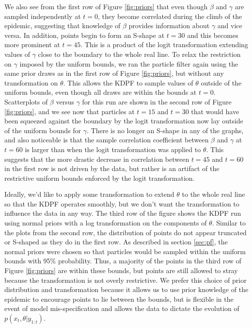 \documentclass{elsarticle}
\begin{document}
We also see from the first row of Figure \ref{fig:priors} that even though $\beta$ and $\gamma$ are sampled independently at $t = 0$, they become correlated during the climb of the epidemic, suggesting that knowledge of $\beta$ provides information about $\gamma$ and vice versa. In addition, points begin to form an S-shape at $t = 30$ and this becomes more prominent at $t = 45$.  This is a product of the logit transformation extending values of $\gamma$ close to the boundary to the whole real line.  To relax the restriction on $\gamma$ imposed by the uniform bounds, we ran the particle filter again using the same prior draws as in the first row of Figure \ref{fig:priors}, but without any transformation on $\theta$.  This allows the KDPF to sample values of $\theta$ outside of the uniform bounds, even though all draws are within the bounds at $t = 0$.  Scatterplots of $\beta$ versus $\gamma$ for this run are shown in the second row of Figure \ref{fig:priors}, and we see now that particles at $t = 15$ and $t = 30$ that would have been squeezed against the boundary by the logit transformation now lay outside of the uniform bounds for $\gamma$.  There is no longer an S-shape in any of the graphs, and also noticeable is that the sample correlation coefficient between $\beta$ and $\gamma$ at $t = 60$ is larger than when the logit transformation was applied to $\theta$.  This suggests that the more drastic decrease in correlation between $t = 45$ and $t = 60$ in the first row is not driven by the data, but rather is an artifact of the restrictive uniform bounds enforced by the logit transformation.

Ideally, we'd like to apply some transformation to extend $\theta$ to the whole real line so that the KDPF operates smoothly, but we don't want the transformation to influence the data in any way.  The third row of the figure shows the KDPF run using normal priors with a log transformation on the components of $\theta$.  Similar to the plots from the second row, the distribution of points do not appear truncated or S-shaped as they do in the first row.  As described in section \ref{sec:pf}, the normal priors were chosen so that particles would be sampled within the uniform bounds with 95\% probability.  Thus, a majority of the points in the third row of Figure \ref{fig:priors} are within these bounds, but points are still allowed to stray because the transformation is not overly restrictive.  We prefer this choice of prior distribution and transformation because it allows us to use prior knowledge of the epidemic to encourage points to lie between the bounds, but is flexible in the event of model mis-specification and allows the data to dictate the evolution of $p(x_t,\theta|y_{1:t})$.
\end{document}
